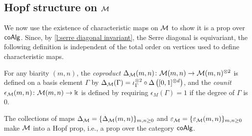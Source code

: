 \subsection{Hopf structure on $\mathcal{M}$}

We now use the existence of characteristic maps on $\mathcal{M}$ to show it is a prop over $\mathsf{coAlg}$.
Since, by \cref{l:serre diagonal invariant}, the Serre diagonal is equivariant, the following definition is independent of the total order on vertices used to define characteristic maps.

\begin{definition}
	For any biarity $(m,n)$, the \textit{coproduct} $\Delta_{\mathcal{M}}(m,n) \colon \mathcal{M}(m,n) \to \mathcal{M}(m,n)^{\otimes 2}$ is defined on a basis element $\Gamma$ by $\Delta_{\mathcal{M}}(\Gamma) = \iota_\Gamma^{\otimes 2} \circ \Delta \left( [0,1]^{\otimes d} \right)$, and the \textit{counit} $\epsilon_{\mathcal{M}}(m,n) \colon \mathcal{M}(m,n) \to \Bbbk$ is defined by requiring $\epsilon_M(\Gamma) = 1$ if the degree of $\Gamma$ is $0$.
\end{definition}

\begin{theorem}
	The collections of maps $\Delta_{\mathcal{M}} = \{\Delta_{\mathcal{M}}(m,n)\}_{m,n \geq 0}$ and $\varepsilon_{\mathcal{M}} = \{\varepsilon_{\mathcal{M}}(m,n)\}_{m,n\geq0}$ make $\mathcal{M}$ into a Hopf prop, i.e., a prop over the category $\mathsf{coAlg}$.
\end{theorem}

